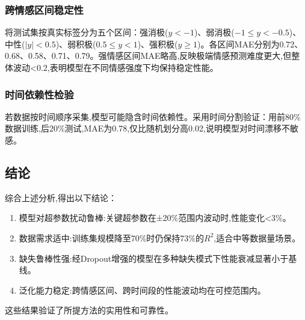 \subsubsection{跨情感区间稳定性}

将测试集按真实标签分为五个区间：强消极($y<-1$)、弱消极($-1 \leq y < -0.5$)、中性($|y|<0.5$)、弱积极($0.5 \leq y < 1$)、强积极($y \geq 1$)。各区间MAE分别为0.72、0.68、0.58、0.71、0.79。强情感区间MAE略高,反映极端情感预测难度更大,但整体波动<0.2,表明模型在不同情感强度下均保持稳定性能。

\subsubsection{时间依赖性检验}

若数据按时间顺序采集,模型可能隐含时间依赖性。采用时间分割验证：用前80\%数据训练,后20\%测试,MAE为0.78,仅比随机划分高0.02,说明模型对时间漂移不敏感。

\subsection{结论}

综合上述分析,得出以下结论：

\begin{enumerate}
\item 模型对超参数扰动鲁棒:关键超参数在±20\%范围内波动时,性能变化<3\%。
\item 数据需求适中:训练集规模降至70\%时仍保持73\%的$R^2$,适合中等数据量场景。
\item 缺失鲁棒性强:经Dropout增强的模型在多种缺失模式下性能衰减显著小于基线。
\item 泛化能力稳定:跨情感区间、跨时间段的性能波动均在可控范围内。
\end{enumerate}

这些结果验证了所提方法的实用性和可靠性。


